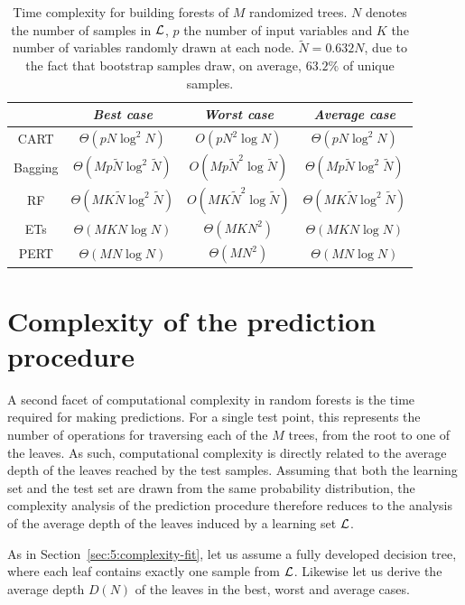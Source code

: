 \begin{table}
    \centering
    \begin{tabular}{| c | c c c |}
    \hline
         & \textit{Best case} & \textit{Worst case} & \textit{Average case}  \\
    \hline
    \hline
    CART & $\Theta(pN\log^2 N)$ & $O(pN^2\log N)$ & $\Theta(pN\log^2 N)$ \\
    Bagging & $\Theta(Mp\widetilde{N}\log^2 \widetilde{N})$ & $O(Mp\widetilde{N}^2\log \widetilde{N})$ & $\Theta(Mp\widetilde{N}\log^2 \widetilde{N})$  \\
    RF & $\Theta(MK\widetilde{N}\log^2 \widetilde{N})$ & $O(MK\widetilde{N}^2\log \widetilde{N})$ & $\Theta(MK\widetilde{N}\log^2 \widetilde{N})$  \\
    ETs & $\Theta(MKN\log N)$ & $\Theta(MKN^2)$ & $\Theta(MKN\log N)$  \\
    PERT & $\Theta(MN\log N)$ & $\Theta(MN^2)$ & $\Theta(MN\log N)$  \\
    \hline
    \end{tabular}
    \caption{Time complexity for building forests of $M$ randomized trees. $N$ denotes the number of samples in ${\cal L}$, $p$ the number of input variables and $K$ the number of variables randomly drawn at each node. $\widetilde{N} = 0.632 N$, due to the fact that bootstrap samples draw, on average, $63.2\%$ of unique samples.}
    \label{table:complexity-fit}
\end{table}

\section{Complexity of the prediction procedure}
\label{sec:5:complexity-predict}

A second facet of computational complexity in random forests is the time
required for making predictions. For a single test point, this represents the
number of operations for traversing each of the $M$ trees, from the root to one
of the leaves. As such, computational complexity is directly related to the
average depth of the leaves reached by the test samples. Assuming that both the
learning set and the test set are drawn from the same probability distribution,
the complexity analysis of the prediction procedure therefore reduces to the
analysis of the average depth of the leaves induced by a learning set ${\cal
L}$.

As in Section~\ref{sec:5:complexity-fit}, let us assume a fully developed
decision tree, where each leaf contains exactly one sample from ${\cal L}$. Likewise
let us derive the average depth $D(N)$ of the leaves in the best,
worst and average cases.

